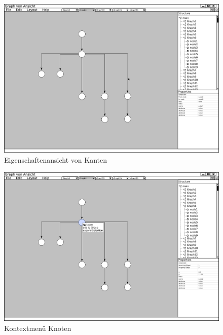 \begin{figure}[ht]
  \centering
  \includegraphics[width=380pt]{resourcen/gui_view_showInfoInProperties_edge.png}
  \caption{Eigenschaftenansicht von Kanten}
  \label{fig:gui_view_showInfoInProperties_edge}
\end{figure}

\begin{figure}[!ht]
  \centering
  \includegraphics[width=380pt]{resourcen/gui_view_nodeMenu.png}
  \caption{Kontextmenü Knoten}
  \label{fig:gui_view_nodeMenu}
\end{figure}

